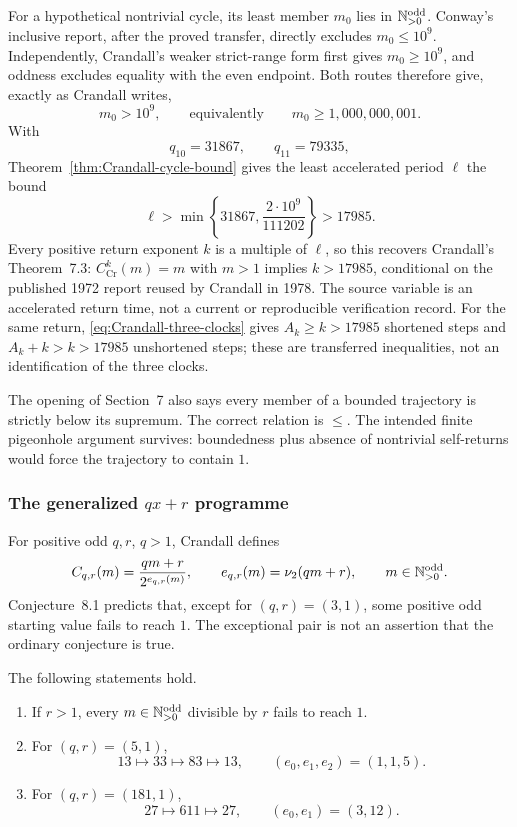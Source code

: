 For a hypothetical nontrivial cycle, its least member $m_0$ lies in
$\mathbb{N}_{>0}^{\mathrm{odd}}$.  Conway's inclusive report, after the proved transfer, directly
excludes $m_0\leq10^9$.  Independently, Crandall's weaker strict-range form
first gives $m_0\geq10^9$, and oddness excludes equality with the even
endpoint.  Both routes therefore give, exactly as Crandall writes,
\[
 m_0>10^9,
 \qquad\text{equivalently}\qquad m_0\geq1{,}000{,}000{,}001.
\]
With
\begin{equation}
\label{eq:Crandall-historical-convergents}
 q_{10}=31867,
 \qquad q_{11}=79335,
\end{equation}
Theorem~\ref{thm:Crandall-cycle-bound} gives the least accelerated period
$\ell$ the bound
\[
 \ell>\min\left\{31867,\frac{2\cdot10^9}{111202}\right\}>17985.
\]
Every positive return exponent $k$ is a multiple of $\ell$, so this recovers
Crandall's Theorem~7.3: $C_{\mathrm{Cr}}^k(m)=m$ with $m>1$ implies
$k>17985$, conditional on the published 1972 report reused by Crandall in
1978.  The source variable is an accelerated return time, not a current or
reproducible verification record.
For the same
return, \eqref{eq:Crandall-three-clocks} gives
$A_k\geq k>17985$ shortened steps and $A_k+k>k>17985$ unshortened steps;
these are transferred inequalities, not an identification of the three
clocks.

\label{sourceissue:Crandall-bounded-supremum}
The opening of Section~7 also says every member of a bounded trajectory is
strictly below its supremum.  The correct relation is $\leq$.  The intended
finite pigeonhole argument survives: boundedness plus absence of nontrivial
self-returns would force the trajectory to contain $1$.

\subsubsection{The generalized \texorpdfstring{$qx+r$}{qx+r} programme}

For positive odd $q,r$, $q>1$, Crandall defines
\begin{equation}
\label{eq:Crandall-qxr}
 C_{q,r}(m)=\frac{qm+r}{2^{e_{q,r}(m)}},
 \qquad
 e_{q,r}(m)=\nu_{2}(qm+r),
 \qquad m\in\mathbb{N}_{>0}^{\mathrm{odd}}.
\end{equation}
Conjecture~8.1 predicts that, except for $(q,r)=(3,1)$, some positive odd
starting value fails to reach $1$.  The exceptional pair is not an assertion
that the ordinary conjecture is true.

\begin{proposition}
\label{prop:Crandall-generalized-failures}
The following statements hold.
\begin{enumerate}[label=(\alph*)]
\item If $r>1$, every $m\in\mathbb{N}_{>0}^{\mathrm{odd}}$ divisible by $r$ fails to reach $1$.
\item For $(q,r)=(5,1)$,
\[
 13\longmapsto33\longmapsto83\longmapsto13,
 \qquad(e_0,e_1,e_2)=(1,1,5).
\]
\item For $(q,r)=(181,1)$,
\[
 27\longmapsto611\longmapsto27,
 \qquad(e_0,e_1)=(3,12).
\]
\end{enumerate}
\end{proposition}

